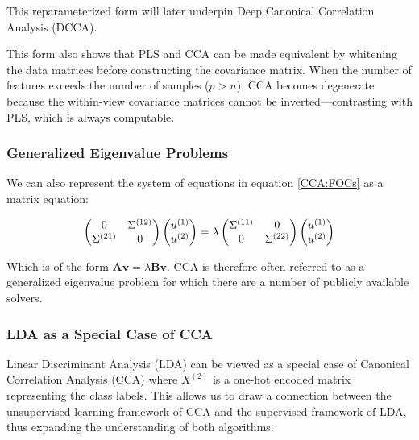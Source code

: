 This reparameterized form will later underpin Deep Canonical Correlation Analysis (DCCA).

This form also shows that PLS and CCA can be made equivalent by whitening the data matrices before constructing the covariance matrix. When the number of features exceeds the number of samples (\(p>n\)), CCA becomes degenerate because the within-view covariance matrices cannot be inverted—contrasting with PLS, which is always computable.

\subsubsection{Generalized Eigenvalue Problems}

We can also represent the system of equations in equation \ref{CCA:FOCs} as a matrix equation:

\begin{align}
    \begin{pmatrix}
        0                    & \Sigma^{(12)} \\
        \Sigma^{(21)} & 0
    \end{pmatrix}
    \begin{pmatrix}
        u^{(1)} \\
        u^{(2)}
    \end{pmatrix}
    =
    \lambda
    \begin{pmatrix}
        \Sigma^{(11)} & 0 \\
        0                    & \Sigma^{(22)}
    \end{pmatrix}
    \begin{pmatrix}
        u^{(1)} \\
        u^{(2)}
    \end{pmatrix}
\end{align}

Which is of the form $\mathbf{A v} = \lambda \mathbf{B v}$. CCA is therefore often referred to as a generalized eigenvalue problem for which there are a number of publicly available solvers.

\subsubsection{LDA as a Special Case of CCA}

Linear Discriminant Analysis (LDA) can be viewed as a special case of Canonical Correlation Analysis (CCA) where \(X^{(2)}\) is a one-hot encoded matrix representing the class labels.
This allows us to draw a connection between the unsupervised learning framework of CCA and the supervised framework of LDA, thus expanding the understanding of both algorithms.

